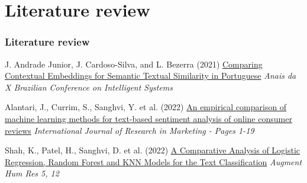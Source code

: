 \section{Literature review}
\begin{frame}
	\frametitle{Literature review}
	
	\begin{thebibliography}{99} %
	\footnotesize %
		\scriptsize
	

		J. Andrade Junior, J. Cardoso-Silva, and L. Bezerra (2021)
		\newblock \href{https://core.ac.uk/download/491169432.pdf}{Comparing Contextual Embeddings for	Semantic Textual Similarity in Portuguese}
		\newblock \scriptsize \emph{Anais da X Brazilian Conference on Intelligent Systems} 


		
		
				

		Alantari, J., Currim, S., Sanghvi, Y. et al. (2022)
		\newblock \href{https://doi.org/10.1016/j.ijresmar.2021.10.011}{An empirical comparison of machine learning methods for text-based sentiment analysis of online consumer reviews}
		\newblock \scriptsize \emph{International Journal of Research in Marketing - Pages 1-19} 

					
		Shah, K., Patel, H., Sanghvi, D. et al. (2022)
		\newblock \href{https://doi.org/10.1007/s41133-020-00032-0}{A Comparative Analysis of Logistic Regression, Random Forest and KNN Models for the Text Classification}
		\newblock \scriptsize \emph{Augment Hum Res 5, 12} 



\end{thebibliography}
\end{frame}
